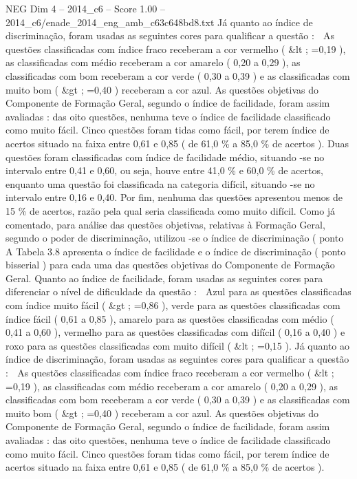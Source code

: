 \begin{textsample}{NEG Dim 4 – 2014\_c6 – Score 1.00 – 2014\_c6/enade\_2014\_eng\_amb\_c63c648bd8.txt}
Já quanto ao índice de discriminação, foram usadas as seguintes cores para qualificar a questão :  As questões classificadas com índice fraco receberam a cor vermelho ( \&lt ; =0,19 ), as classificadas com médio receberam a cor amarelo ( 0,20 a 0,29 ), as classificadas com bom receberam a cor verde ( 0,30 a 0,39 ) e as classificadas com muito bom ( \&gt ; =0,40 ) receberam a cor azul.
As questões objetivas do Componente de Formação Geral, segundo o índice de facilidade, foram assim avaliadas : das oito questões, nenhuma teve o índice de facilidade classificado como muito fácil.
Cinco questões foram tidas como fácil, por terem índice de acertos situado na faixa entre 0,61 e 0,85 ( de 61,0 \% a 85,0 \% de acertos ).
Duas questões foram classificadas com índice de facilidade médio, situando -se no intervalo entre 0,41 e 0,60, ou seja, houve entre 41,0 \% e 60,0 \% de acertos, enquanto uma questão foi classificada na categoria difícil, situando -se no intervalo entre 0,16 e 0,40.
Por fim, nenhuma das questões apresentou menos de 15 \% de acertos, razão pela qual seria classificada como muito difícil.
Como já comentado, para análise das questões objetivas, relativas à Formação Geral, segundo o poder de discriminação, utilizou -se o índice de discriminação ( ponto A Tabela 3.8 apresenta o índice de facilidade e o índice de discriminação ( ponto bisserial ) para cada uma das questões objetivas do Componente de Formação Geral.
Quanto ao índice de facilidade, foram usadas as seguintes cores para diferenciar o nível de dificuldade da questão :  Azul para as questões classificadas com índice muito fácil ( \&gt ; =0,86 ), verde para as questões classificadas com índice fácil ( 0,61 a 0,85 ), amarelo para as questões classificadas com médio ( 0,41 a 0,60 ), vermelho para as questões classificadas com difícil ( 0,16 a 0,40 ) e roxo para as questões classificadas com muito difícil ( \&lt ; =0,15 ).
Já quanto ao índice de discriminação, foram usadas as seguintes cores para qualificar a questão :  As questões classificadas com índice fraco receberam a cor vermelho ( \&lt ; =0,19 ), as classificadas com médio receberam a cor amarelo ( 0,20 a 0,29 ), as classificadas com bom receberam a cor verde ( 0,30 a 0,39 ) e as classificadas com muito bom ( \&gt ; =0,40 ) receberam a cor azul.
As questões objetivas do Componente de Formação Geral, segundo o índice de facilidade, foram assim avaliadas : das oito questões, nenhuma teve o índice de facilidade classificado como muito fácil.
Cinco questões foram tidas como fácil, por terem índice de acertos situado na faixa entre 0,61 e 0,85 ( de 61,0 \% a 85,0 \% de acertos ).

\end{textsample}
